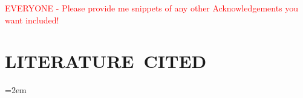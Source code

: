 \documentclass[letterpaper]{ar-1col}
\newcommand{\textred}[1]{\textcolor{red}{ #1}}
\begin{document}
\textred{EVERYONE - Please provide me snippets of any other Acknowledgements you want included!}

%
\section*{LITERATURE\ CITED}

\emergencystretch=2em









 

\end{document}
